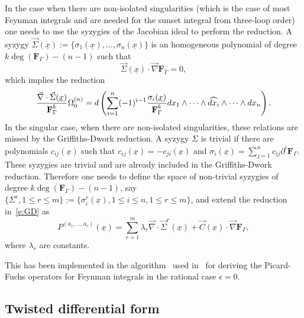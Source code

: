 \documentclass[a4paper,12pt]{article}
\numberwithin{equation}{section}
\numberwithin{figure}{section}
\begin{document}
In the case when there are non-isolated singularities (which is the
case of most Feynman integrals and are needed for the sunset
integral from three-loop order) one needs to use
the syzygies of the Jacobian ideal to perform the
reduction.
A syzygy  $\vec\Sigma(\underline x):=\{\sigma_1(\underline x),\dots,\sigma_n(\underline x)\}$ is an homogeneous polynomial of
degree $k \deg(\textbf{F}_\Gamma)-(n-1)$ such that
\begin{equation}
  \vec \Sigma(\underline x) \cdot \vec\nabla  \textbf{F}_\Gamma=0,
\end{equation}
%
which implies the reduction
\begin{equation}
  { \vec \nabla\cdot \vec\Sigma(\underline x) \over \textbf{F}_\Gamma^k
  }\Omega_0^{(n)}=d\left(\sum_{i=1}^n (-1)^{i-1} {\sigma_i(\underline x)\over
      \textbf{F}_\Gamma^k} dx_1\wedge \cdots \wedge
    \widehat{dx_i}\wedge \cdots \wedge dx_n\right).
\end{equation}
In the singular case, when there are non-isolated singularities, these
relations are missed by the Griffiths-Dwork reduction.
A syzygy $\Sigma$ is trivial if there are polynomials
$c_{ij}(\underline x)$ such that $c_{ij}(\underline
x)=-c_{ji}(\underline x)$ and  $\sigma_i(\underline x)= \sum_{j=1}^n
c_{ij} \partial^i \textbf{F}_\Gamma$.  These syzygies are trivial and
are already included in the Griffiths-Dwork reduction.
Therefore one needs to define the space of non-trivial syzygies of
degree $k \deg(\textbf{F}_\Gamma)-(n-1)$, say $\{\Sigma^r,1\leq r\leq m\}:=\{\sigma_i^r(\underline
x),  1\leq i\leq n,  1\leq r\leq m\}$, and extend the reduction
in~\eqref{e:GD} as 
\begin{equation}\label{e:GDsyz}
  P^{(a_1,\dots,a_r)}(\underline x)=   \sum_{r=1}^m
  \lambda_r\vec\nabla\cdot \vec \Sigma^r(\underline x)+
  \vec C(\underline
  x)\cdot \vec \nabla \textbf{F}_\Gamma ,
\end{equation}
where $\lambda_r$ are constants.

This has been implemented in the algorithm~\cite{lairez2016computing}
used in~\cite{Lairez:2022zkj} for deriving the Picard-Fuchs operators for
Feynman integrals in the rational case $\epsilon=0$.

\subsection{Twisted differential form}
\label{sec:non-rati-diff-form}
\end{document}
